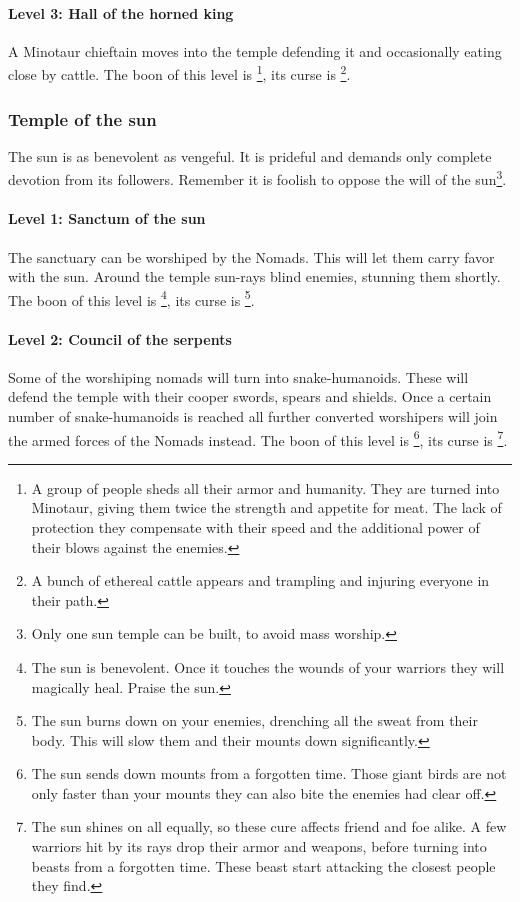 \documentclass[a4paper]{book}
\begin{document}
\paragraph{Level 3: Hall of the horned king}
A Minotaur chieftain moves into the temple defending it and occasionally eating
close by cattle. The boon of this level is \footnote{ A group of people sheds all their armor and humanity. They are
	turned into Minotaur, giving them twice the strength and appetite for meat. The
	lack of protection they compensate with their speed and the additional power of
	their blows against the enemies. }, its curse is \footnote{ A bunch of ethereal cattle appears and trampling and injuring
	everyone in their path. }.

\subsubsection{Temple of the sun}
The sun is as benevolent as vengeful. It is prideful and demands only complete
devotion from its followers. Remember it is foolish to oppose the will of the
sun\footnote{ Only one sun temple can be built, to avoid mass worship. }.

\paragraph{Level 1: Sanctum of the sun}
The sanctuary can be worshiped by the \gls{Nomads}. This will let them carry
favor with the sun. Around the temple sun-rays blind enemies, stunning them
shortly. The boon of this level is \footnote{ The sun is
	benevolent. Once it touches the wounds of your warriors they will magically
	heal. Praise the sun. }, its curse is \footnote{ The
	sun burns down on your enemies, drenching all the sweat from their body. This
	will slow them and their mounts down significantly. }.

\paragraph{Level 2: Council of the serpents}
Some of the worshiping nomads will turn into snake-humanoids. These will defend
the temple with their cooper swords, spears and shields. Once a certain number
of snake-humanoids is reached all further converted worshipers will join the
armed forces of the \gls{Nomads} instead. The boon of this level is
\footnote{ The sun sends down mounts from a
	forgotten time. Those giant birds are not only faster than your mounts they can
	also bite the enemies had clear off. }, its curse is \footnote{ The sun shines on all equally, so these cure affects friend
	and foe alike. A few warriors hit by its rays drop their armor and weapons,
	before turning into beasts from a forgotten time. These beast start attacking
	the closest people they find. }.
\end{document}
